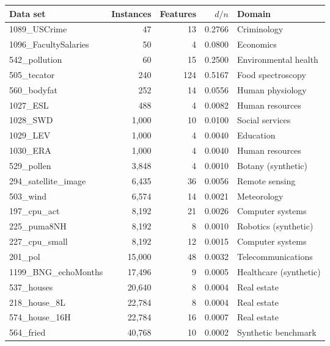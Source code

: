 \begin{tabular}{lrrrl}
\toprule
\textbf{Data set} & \textbf{Instances} & \textbf{Features} & \textbf{$d/n$} & \textbf{Domain} \\
\midrule
1089\_USCrime & 47 & 13 & 0.2766 & Criminology \\
1096\_FacultySalaries & 50 & 4 & 0.0800 & Economics \\
542\_pollution & 60 & 15 & 0.2500 & Environmental health \\
505\_tecator & 240 & 124 & 0.5167 & Food spectroscopy \\
560\_bodyfat & 252 & 14 & 0.0556 & Human physiology \\
1027\_ESL & 488 & 4 & 0.0082 & Human resources \\
1028\_SWD & 1{,}000 & 10 & 0.0100 & Social services \\
1029\_LEV & 1{,}000 & 4 & 0.0040 & Education \\
1030\_ERA & 1{,}000 & 4 & 0.0040 & Human resources \\
529\_pollen & 3{,}848 & 4 & 0.0010 & Botany (synthetic) \\
294\_satellite\_image & 6{,}435 & 36 & 0.0056 & Remote sensing \\
503\_wind & 6{,}574 & 14 & 0.0021 & Meteorology \\
197\_cpu\_act & 8{,}192 & 21 & 0.0026 & Computer systems \\
225\_puma8NH & 8{,}192 & 8 & 0.0010 & Robotics (synthetic) \\
227\_cpu\_small & 8{,}192 & 12 & 0.0015 & Computer systems \\
201\_pol & 15{,}000 & 48 & 0.0032 & Telecommunications \\
1199\_BNG\_echoMonths & 17{,}496 & 9 & 0.0005 & Healthcare (synthetic) \\
537\_houses & 20{,}640 & 8 & 0.0004 & Real estate \\
218\_house\_8L & 22{,}784 & 8 & 0.0004 & Real estate \\
574\_house\_16H & 22{,}784 & 16 & 0.0007 & Real estate \\
564\_fried & 40{,}768 & 10 & 0.0002 & Synthetic benchmark \\
\bottomrule
\end{tabular}

